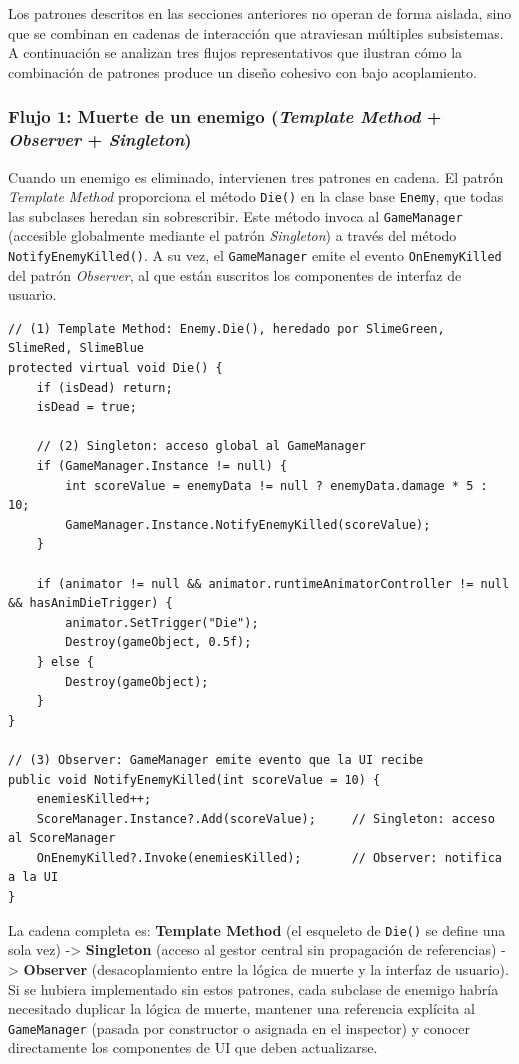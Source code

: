 Los patrones descritos en las secciones anteriores no operan de forma aislada, sino que se combinan en cadenas de interacción que atraviesan múltiples subsistemas. A continuación se analizan tres flujos representativos que ilustran cómo la combinación de patrones produce un diseño cohesivo con bajo acoplamiento.

\subsubsection{Flujo 1: Muerte de un enemigo (\textit{Template Method} + \textit{Observer} + \textit{Singleton})}


Cuando un enemigo es eliminado, intervienen tres patrones en cadena. El patrón \textit{Template Method} proporciona el método \texttt{Die()} en la clase base \texttt{Enemy}, que todas las subclases heredan sin sobrescribir. Este método invoca al \texttt{GameManager} (accesible globalmente mediante el patrón \textit{Singleton}) a través del método \texttt{NotifyEnemyKilled()}. A su vez, el \texttt{GameManager} emite el evento \texttt{OnEnemyKilled} del patrón \textit{Observer}, al que están suscritos los componentes de interfaz de usuario.

\begin{lstlisting}
// (1) Template Method: Enemy.Die(), heredado por SlimeGreen, SlimeRed, SlimeBlue
protected virtual void Die() {
    if (isDead) return;
    isDead = true;
    
    // (2) Singleton: acceso global al GameManager
    if (GameManager.Instance != null) {
        int scoreValue = enemyData != null ? enemyData.damage * 5 : 10;
        GameManager.Instance.NotifyEnemyKilled(scoreValue);
    }
    
    if (animator != null && animator.runtimeAnimatorController != null && hasAnimDieTrigger) {
        animator.SetTrigger("Die");
        Destroy(gameObject, 0.5f);
    } else {
        Destroy(gameObject);
    }
}

// (3) Observer: GameManager emite evento que la UI recibe
public void NotifyEnemyKilled(int scoreValue = 10) {
    enemiesKilled++;
    ScoreManager.Instance?.Add(scoreValue);     // Singleton: acceso al ScoreManager
    OnEnemyKilled?.Invoke(enemiesKilled);       // Observer: notifica a la UI
}
\end{lstlisting}


La cadena completa es: \textbf{Template Method} (el esqueleto de \texttt{Die()} se define una sola vez) -> \textbf{Singleton} (acceso al gestor central sin propagación de referencias) -> \textbf{Observer} (desacoplamiento entre la lógica de muerte y la interfaz de usuario). Si se hubiera implementado sin estos patrones, cada subclase de enemigo habría necesitado duplicar la lógica de muerte, mantener una referencia explícita al \texttt{GameManager} (pasada por constructor o asignada en el inspector) y conocer directamente los componentes de UI que deben actualizarse.

